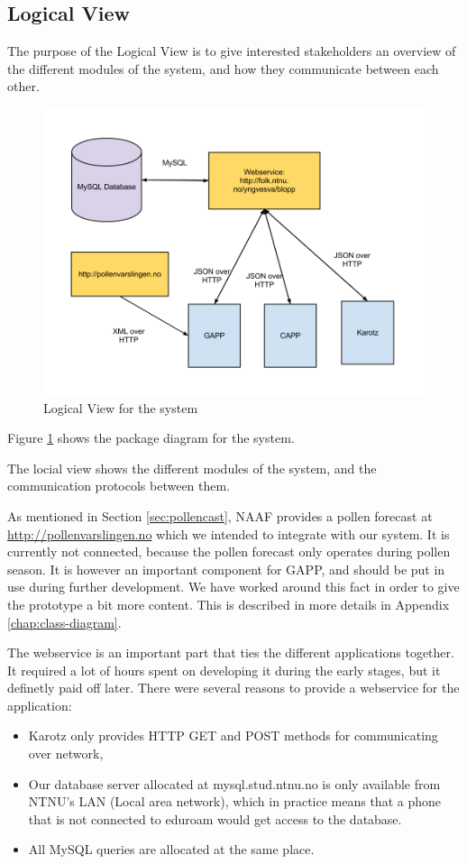 \clearpage{}
\subsection{Logical View}
\label{sec:logical-view-parent}
The purpose of the Logical View is to give interested stakeholders an overview of the different modules of the system, 
and how they communicate between each other. 
   

\begin{figure}
	\centering
		\includegraphics[width = 11.5 cm]{Pictures/ArchPictures/logicview.png}
	\caption{Logical View for the system} 
	\label{fig:package-diagram-system}
\end{figure}

Figure \ref{fig:package-diagram-system} shows the package diagram for the system. 

The locial view shows the different modules of the system, and the communication protocols between them. 


As mentioned in Section \ref{sec:pollencast}, NAAF provides a pollen forecast at \url{http://pollenvarslingen.no} which we intended to integrate with our system. It is currently not connected,
because the pollen forecast only operates during pollen season. It is however an important component for GAPP, and should be put in use during further development. 
We have worked around this fact in order to give the prototype a bit more content. This is described in more details in Appendix \ref{chap:class-diagram}.
 

The webservice is an important part that ties the different applications together. It required a lot of hours spent on developing it during the early stages, but
it definetly paid off later. 
There were several reasons to provide a webservice for the application:
\begin{itemize}
  \item Karotz only provides HTTP GET and POST methods for communicating over network,
  \item Our database server allocated at mysql.stud.ntnu.no is only available from NTNU's LAN (Local area network), which in practice means that a phone that is not connected to eduroam would get access to the database. 
  \item All MySQL queries are allocated at the same place.
\end{itemize}



